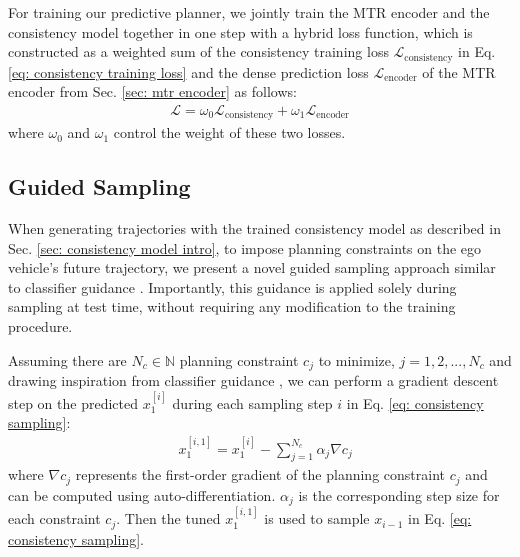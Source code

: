 
For training our predictive planner, we jointly train the MTR encoder and the consistency model together in one step with a hybrid loss function, which is constructed as a weighted sum of the consistency training loss $\mathcal{L}_{\text{consistency}}$ in Eq. \eqref{eq: consistency training loss} and the dense prediction loss $\mathcal{L}_{\text{encoder}}$ of the MTR encoder from Sec. \ref{sec: mtr encoder} as follows:
\begin{align}
    \mathcal{L} = \omega_0 \mathcal{L}_{\text{consistency}} + \omega_1 \mathcal{L}_{\text{encoder}}
\end{align}
where $\omega_0$ and $\omega_1$ control
the weight of these two losses.

\subsection{Guided Sampling} \label{sec: guided sampling}

When generating trajectories with the trained consistency model as described in Sec. \ref{sec: consistency model intro}, to impose planning constraints on the ego vehicle's future trajectory, we present a novel guided sampling approach similar to classifier guidance \cite{dhariwal2021diffusion}.
Importantly, this guidance is applied solely during sampling at test time, without requiring any modification to the training procedure.

Assuming there are $N_c \in \mathbb{N}$ planning constraint $c_j$ to minimize, $j = 1,2, ..., N_c$ and drawing inspiration from classifier guidance \citep{dhariwal2021diffusion}, we can perform a gradient descent step on the predicted $x_1^{[i]}$ during each sampling step $i$ in Eq. \eqref{eq: consistency sampling}:
\begin{align} \label{eq: original gradient descent}
     &x_1^{[i, 1]} = x_1^{[i]} - \sum^{N_c}_{j=1}\alpha_{j} \nabla c_j  
\end{align}
where $\nabla c_j$ represents the first-order gradient of the planning constraint $c_j$ and can be computed using auto-differentiation.
$\alpha_j$ is the corresponding step size for each constraint $c_j$.
Then the tuned $x_1^{[i, 1]}$ is used to sample $x_{i-1}$ in Eq. \eqref{eq: consistency sampling}.

